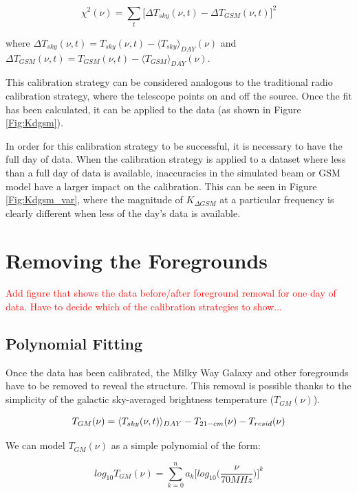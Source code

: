 \begin{equation}
\chi^2(\nu) =  \sum_t \big [ \Delta T_{sky}(\nu,t) - \Delta T_{GSM}(\nu,t) \big ]^2
\end{equation}

where $\Delta T_{sky} (\nu, t) = T_{sky}(\nu,t)-\langle T_{sky} \rangle_{DAY} (\nu)$ and $\Delta T_{GSM} (\nu,t) = T_{GSM}(\nu,t)-\langle T_{GSM} \rangle_{DAY} (\nu)$. 

This calibration strategy can be considered analogous to the traditional radio calibration strategy, where the telescope points on and off the source. Once the fit has been calculated, it can be applied to the data (as shown in Figure \ref{Fig:Kdgsm}). 


In order for this calibration strategy to be successful, it is necessary to have the full day of data. When the calibration strategy is applied to a dataset where less than a full day of data is available, inaccuracies in the simulated beam or GSM model have a larger impact on the calibration. This can be seen in Figure \ref{Fig:Kdgsm_var}, where the magnitude of $K_{\Delta GSM}$ at a particular frequency is clearly different when less of the day's data is available. 

\section{Removing the Foregrounds}\label{Sec:fore}

\textcolor{red}{Add figure that shows the data before/after foreground removal for one day of data. Have to decide which of the calibration strategies to show...}

\subsection{Polynomial Fitting}
Once the data has been calibrated, the Milky Way Galaxy and other foregrounds have to be removed to reveal the \cm structure. This removal is possible thanks to the simplicity of the galactic sky-averaged brightness temperature ($T_{GM}(\nu)$). 

\begin{equation}
T_{GM}(\nu) = \langle T_{sky}(\nu,t) \rangle_{DAY} - T_{21-cm} (\nu) - T_{resid} (\nu)
\end{equation}

We can model $T_{GM} (\nu)$ as a simple polynomial of the form:

\begin{equation}
log_{10} T_{GM}(\nu) = \sum_{k=0}^n a_k \Big[ log_{10} \Big(\frac{\nu}{70 MHz}\Big) \Big]^k
\end{equation}

